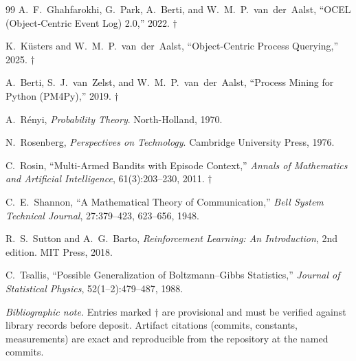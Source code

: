 \documentclass[12pt,oneside]{report}
\theoremstyle{plain}
\theoremstyle{definition}
\theoremstyle{remark}
\newcommand{\daggerfootnote}{$\dagger$\ }
\begin{document}
\begin{thebibliography}{99}
A.~F.~Ghahfarokhi, G.~Park, A.~Berti, and W.~M.~P.~van~der~Aalst,
``OCEL (Object-Centric Event Log) 2.0,'' 2022. \daggerfootnote

K.~K\"usters and W.~M.~P.~van~der~Aalst, ``Object-Centric Process
Querying,'' 2025. \daggerfootnote

A.~Berti, S.~J.~van~Zelst, and W.~M.~P.~van~der~Aalst, ``Process
Mining for Python (PM4Py),'' 2019. \daggerfootnote

A.~R\'enyi, \emph{Probability Theory}. North-Holland, 1970.

N.~Rosenberg, \emph{Perspectives on Technology}. Cambridge University
Press, 1976.

C.~Rosin, ``Multi-Armed Bandits with Episode Context,''
\emph{Annals of Mathematics and Artificial Intelligence},
61(3):203--230, 2011. \daggerfootnote

C.~E.~Shannon, ``A Mathematical Theory of Communication,'' \emph{Bell
System Technical Journal}, 27:379--423, 623--656, 1948.

R.~S.~Sutton and A.~G.~Barto, \emph{Reinforcement Learning: An
Introduction}, 2nd edition. MIT Press, 2018.

C.~Tsallis, ``Possible Generalization of Boltzmann--Gibbs
Statistics,'' \emph{Journal of Statistical Physics},
52(1--2):479--487, 1988.

\end{thebibliography}

\begin{flushleft}
\footnotesize
\emph{Bibliographic note.} Entries marked $\dagger$ are provisional and
must be verified against library records before deposit. Artifact
citations (commits, constants, measurements) are exact and reproducible
from the repository at the named commits.
\end{flushleft}
\end{document}

